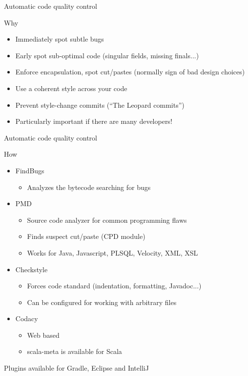 \documentclass[presentation]{beamer}
\begin{document}
\begin{frame}[fragile]{Automatic code quality control}
	\begin{block}{Why}
		\begin{itemize}
			\item Immediately spot subtle bugs
			\item Early spot sub-optimal code (singular fields, missing finals...)
			\item Enforce encapsulation, spot cut/pastes (normally sign of bad design choices)
			\item Use a coherent style across your code
			\item Prevent style-change commits (``The Leopard commits'')
			\item Particularly important if there are many developers!
		\end{itemize}
	\end{block}
\end{frame}

\begin{frame}[fragile]{Automatic code quality control}
	\begin{block}{How}
		\begin{itemize}
			\item FindBugs
			\begin{itemize}
				\item Analyzes the bytecode searching for bugs
			\end{itemize}
			\item PMD
			\begin{itemize}
				\item Source code analyzer for common programming flaws
				\item Finds suspect cut/paste (CPD module)
				\item Works for Java, Javascript, PLSQL, Velocity, XML, XSL
			\end{itemize}
			\item Checkstyle
			\begin{itemize}
				\item Forces code standard (indentation, formatting, Javadoc...)
				\item Can be configured for working with arbitrary files
			\end{itemize}
			\item Codacy
			\begin{itemize}
				\item Web based
				\item scala-meta is available for Scala
			\end{itemize}
		\end{itemize}
	Plugins available for Gradle, Eclipse and IntelliJ
	\end{block}
\end{frame}
\end{document}
